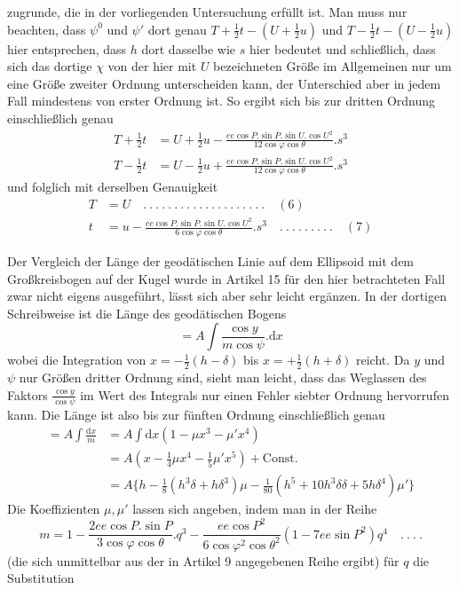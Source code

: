 %
zugrunde, die in der vorliegenden Untersuchung erfüllt ist. Man muss nur beachten, dass \(\psi^0\) und \(\psi'\) dort genau \(T+\frac12t-(U+\frac12u)\) und \(T-\frac12t-(U-\frac12u)\) hier entsprechen, dass \(h\) dort dasselbe wie \(s\) hier bedeutet und schließlich, dass sich das dortige \(\chi\) von der hier mit \(U\) bezeichneten Größe im Allgemeinen nur um eine Größe zweiter Ordnung unterscheiden kann, der Unterschied aber in jedem Fall mindestens von erster Ordnung ist. So ergibt sich bis zur dritten Ordnung einschließlich genau
\[
\begin{aligned}
T+\tfrac12t&=U+\tfrac12u-\frac{ee\cos P\mathord{.}\sin P\mathord{.}\sin U\mathord{.}\cos U^2}{12\cos\varphi\cos\theta}\mathord{.}s^3\\
T-\tfrac12t&=U-\tfrac12u+\frac{ee\cos P\mathord{.}\sin P\mathord{.}\sin U\mathord{.}\cos U^2}{12\cos\varphi\cos\theta}\mathord{.}s^3
\end{aligned}
\]
und folglich mit derselben Genauigkeit
\[
\begin{aligned}
T&=U\quad .\ .\ .\ .\ .\ .\ .\ .\ .\ .\ .\ .\ .\ .\ .\ .\ .\ .\ .\ .\quad(6)\\
t&=u-\frac{ee\cos P\mathord{.}\sin P\mathord{.}\sin U\mathord{.}\cos U^2}{6\cos\varphi\cos\theta}\mathord{.}s^3\quad .\ .\ .\ .\ .\ .\ .\ .\ .\quad(7)
\end{aligned}
\]

\indent Der Vergleich der Länge der geodätischen Linie auf dem Ellipsoid mit dem Großkreisbogen auf der Kugel wurde in Artikel 15 für den hier betrachteten Fall zwar nicht eigens ausgeführt, lässt sich aber sehr leicht ergänzen. In der dortigen Schreibweise ist die Länge des geodätischen Bogens
\[
=A\int\frac{\cos y}{m\cos\psi}\mathord{.}\mathrm{d}x
\]
wobei die Integration von \(x=-\frac12(h-\delta)\) bis \(x=+\frac12(h+\delta)\) reicht. Da \(y\) und \(\psi\) nur Größen dritter Ordnung sind, sieht man leicht, dass das Weglassen des Faktors \(\frac{\cos y}{\cos\psi}\) im Wert des Integrals nur einen Fehler siebter Ordnung hervorrufen kann. Die Länge ist also bis zur fünften Ordnung einschließlich genau
\[
\begin{aligned}
=A\int\frac{\mathrm{d}x}{m}&=A\int\mathrm{d}x(1-\mu x^3-\mu'x^4)\\
&=A(x-\tfrac14\mu x^4-\tfrac15\mu'x^5)+\text{Const.}\\
&=A\{h-\tfrac18(h^3\delta+h\delta^3)\mu-\tfrac1{80}(h^5+10h^3\delta\delta+5h\delta^4)\mu'\}
\end{aligned}
\]
Die Koeffizienten \(\mu,\mu'\) lassen sich angeben, indem man in der Reihe
\[
m=1-\frac{2ee\cos P\mathord{.}\sin P}{3\cos\varphi\cos\theta}\mathord{.}q^3-\frac{ee\cos P^2}{6\cos\varphi^2\cos\theta^2}(1-7ee\sin P^2)q^4\quad .\ .\ .\ .
\]
(die sich unmittelbar aus der in Artikel 9 angegebenen Reihe ergibt) für \(q\) die Substitution
